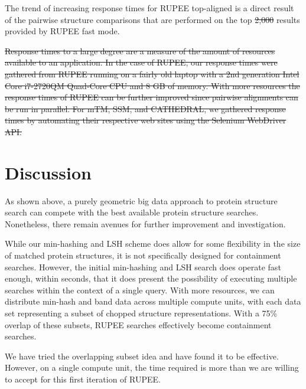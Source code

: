 \documentclass[10pt,letterpaper]{article}
\providecommand{\DIFaddtex}[1]{{\protect\color{blue}\uwave{#1}}} %
\providecommand{\DIFdeltex}[1]{{\protect\color{red}\sout{#1}}}                      %
\providecommand{\DIFaddbegin}{} %
\providecommand{\DIFaddend}{} %
\providecommand{\DIFdelbegin}{} %
\providecommand{\DIFdelend}{} %
\providecommand{\DIFadd}[1]{\texorpdfstring{\DIFaddtex{#1}}{#1}} %
\providecommand{\DIFdel}[1]{\texorpdfstring{\DIFdeltex{#1}}{}} %
\newcommand{\DIFscaledelfig}{0.5}
\newlength{\DIFdelgraphicswidth} %
\newlength{\DIFdelgraphicsheight} %
\newcommand{\DIFaddincludegraphics}[2][]{{\color{blue}\fbox{\DIFOincludegraphics[#1]{#2}}}} %
\newcommand{\DIFdelincludegraphics}[2][]{%
\sbox{\DIFdelgraphicsbox}{\DIFOincludegraphics[#1]{#2}}%
\settoboxwidth{\DIFdelgraphicswidth}{\DIFdelgraphicsbox} %
\settoboxtotalheight{\DIFdelgraphicsheight}{\DIFdelgraphicsbox} %
\scalebox{\DIFscaledelfig}{%
\parbox[b]{\DIFdelgraphicswidth}{\usebox{\DIFdelgraphicsbox}\\[-\baselineskip] \rule{\DIFdelgraphicswidth}{0em}}\llap{\resizebox{\DIFdelgraphicswidth}{\DIFdelgraphicsheight}{%
\setlength{\unitlength}{\DIFdelgraphicswidth}%
\begin{picture}(1,1)%
\thicklines\linethickness{2pt} %
{\color[rgb]{1,0,0}\put(0,0){\framebox(1,1){}}}%
{\color[rgb]{1,0,0}\put(0,0){\line( 1,1){1}}}%
{\color[rgb]{1,0,0}\put(0,1){\line(1,-1){1}}}%
\end{picture}%
}\hspace*{3pt}}} %
} %
\DeclareRobustCommand{\DIFaddbegin}{\DIFOaddbegin \let\includegraphics\DIFaddincludegraphics} %
\DeclareRobustCommand{\DIFaddend}{\DIFOaddend \let\includegraphics\DIFOincludegraphics} %
\DeclareRobustCommand{\DIFdelbegin}{\DIFOdelbegin \let\includegraphics\DIFdelincludegraphics} %
\DeclareRobustCommand{\DIFdelend}{\DIFOaddend \let\includegraphics\DIFOincludegraphics} %
\begin{document}
The trend of increasing response times for RUPEE top-aligned is a direct result of the pairwise structure comparisons that are performed on the top \DIFdelbegin \DIFdel{2,000 }\DIFdelend \DIFaddbegin \DIFadd{8000 }\DIFaddend results provided by RUPEE fast mode.

\DIFdelbegin \DIFdel{Response times to a large degree are a measure of the amount of resources available to an application. 
In the case of RUPEE, our response times were gathered from RUPEE running on a fairly old laptop with a 2nd generation Intel\textregistered{} Core\texttrademark{} i7-2720QM Quad-Core CPU and 8 GB of memory. 
With more resources the response times of RUPEE can be further improved since pairwise alignments can be run in parallel. 
For mTM, SSM, and CATHEDRAL, we gathered response times by automating their respective web sites using the Selenium WebDriver API. 
}%

\DIFdelend \section*{Discussion}

As shown above, a purely geometric big data approach to protein structure search can compete with the best available protein structure searches.
Nonetheless, there remain avenues for further improvement and investigation. 

While our min-hashing and LSH scheme does allow for some flexibility in the size of matched protein structures, it is not specifically designed for containment searches. 
However, the initial min-hashing and LSH search does operate fast enough, within seconds, that it does present the possibility of executing multiple searches within the context of a single query. 
With more resources, we can distribute min-hash and band data across multiple compute units, with each data set representing a subset of chopped structure representations. 
With a 75\% overlap of these subsets, RUPEE searches effectively become containment searches. 

We have tried the overlapping subset idea and have found it to be effective. 
However, on a single compute unit, the time required is more than we are willing to accept for this first iteration of RUPEE. 
\end{document}
